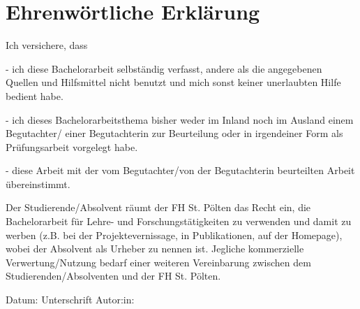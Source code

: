 \chapter*{Ehrenwörtliche Erklärung}
\label{ch:erklaerung}

Ich versichere, dass 

\begin{justify}
- ich diese Bachelorarbeit selbständig verfasst, andere als die angegebenen Quellen und Hilfsmittel nicht benutzt und mich sonst keiner unerlaubten Hilfe bedient habe.
\end{justify}

\begin{justify}
- ich dieses Bachelorarbeitsthema bisher weder im Inland noch im Ausland einem Begutachter/ einer Begutachterin zur Beurteilung oder in irgendeiner Form als Prüfungsarbeit vorgelegt habe.	
\end{justify}

\begin{justify}
- diese Arbeit mit der vom Begutachter/von der Begutachterin beurteilten Arbeit übereinstimmt. 
\end{justify}

\begin{justify}
Der Studierende/Absolvent räumt der FH St. Pölten das Recht ein, die Bachelorarbeit für Lehre- und Forschungstätigkeiten zu verwenden und damit zu werben (z.B. bei der Projektevernissage, in Publikationen, auf der Homepage), wobei der Absolvent als Urheber zu nennen ist. Jegliche kommerzielle Verwertung/Nutzung bedarf einer weiteren Vereinbarung zwischen dem Studierenden/Absolventen und der FH St. Pölten. \\[1.5cm]	
\end{justify}

Datum:	\hrulefill\enspace Unterschrift Autor:in: \hrulefill
\\[3.5cm]